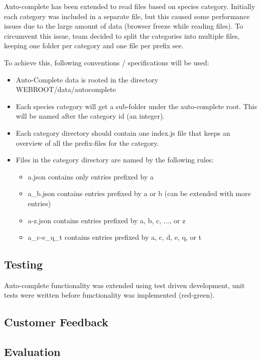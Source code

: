 	Auto-complete has been extended to read files based on species category.
	Initially each category was included in a separate file, but this caused some
	performance issues due to the large amount of data (browser freeze while reading
	files). To circumvent this issue, team decided to split the categories into
	multiple files, keeping one folder per category and one file per prefix see.

	To achieve this, following conventions / specifications will be used:

	\begin{itemize}
		\item Auto-Complete data is rooted in the directory WEBROOT/data/autocomplete
		\item Each species category will get a sub-folder under the auto-complete
		root. This will be named after the category id (an integer).
		\item Each category directory should contain one index.js file that
		keeps an overview of all the prefix-files for the category.
		\item Files in the category directory are named by the following rules:
			\begin{itemize}
				\item a.json contains only entries prefixed by a
				\item a\_b.json contains entries prefixed by a or b (can be
				extended with more entries)
				\item a-z.json contains entries prefixed by a, b, c, ..., or z
				\item a\_c-e\_q\_t contains entries prefixed by a, c, d, e, q, or t
			\end{itemize}
	\end{itemize}

\subsection{Testing}

Auto-complete functionality was extended using test driven development, unit
tests were written before functionality was implemented (red-green).

\subsection{Customer Feedback}

\subsection{Evaluation}
